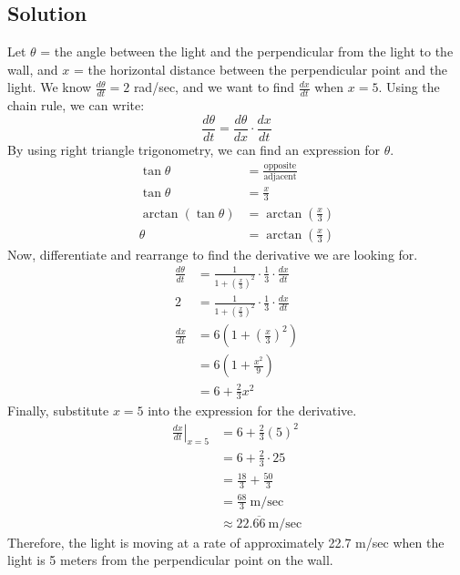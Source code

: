 \documentclass[12pt]{article}
\newcommand\at[2]{\left.#1\right|_{#2}}
\begin{document}
\subsection*{Solution}

Let $ \theta $ = the angle between the light and the perpendicular from the light to the wall, and $ x $ = the horizontal distance between the perpendicular point and the light.
\medskip
\newline
We know $ \frac{d\theta}{dt} = 2 $ rad/sec, and we want to find $ \frac{dx}{dt} $ when $ x = 5 $. Using the chain rule, we can write:
\[ \frac{d\theta}{dt} = \frac{d\theta}{dx} \cdot \frac{dx}{dt} \]
By using right triangle trigonometry, we can find an expression for $ \theta $.
\begin{align*}
    \tan \theta & = \frac{\text{opposite}}{\text{adjacent}} \\
    \tan \theta & = \frac{x}{3} \\
    \arctan \left( \tan \theta \right) & = \arctan \left( \frac{x}{3} \right) \\
    \theta & = \arctan \left( \frac{x}{3} \right)
\end{align*}
Now, differentiate and rearrange to find the derivative we are looking for.
\begin{align*}
    \frac{d\theta}{dt} & = \frac{1}{1 + \left( \frac{x}{3} \right)^2} \cdot \frac{1}{3} \cdot \frac{dx}{dt} \\
    2 & = \frac{1}{1 + \left( \frac{x}{3} \right)^2} \cdot \frac{1}{3} \cdot \frac{dx}{dt} \\
    \frac{dx}{dt} & = 6 \left( 1 + \left( \frac{x}{3} \right)^2 \right) \\
    & = 6 \left( 1 + \frac{x^2}{9} \right) \\
    & = 6 + \frac{2}{3} x^2 
\end{align*}
Finally, substitute $ x = 5 $ into the expression for the derivative.
\begin{align*}
    \at{\frac{dx}{dt}}{x = 5} & = 6 + \frac{2}{3} \left( 5 \right)^2 \\
    & = 6 + \frac{2}{3} \cdot 25 \\
    & = \frac{18}{3} + \frac{50}{3} \\
    & = \frac{68}{3} \ \text{m/sec} \\
    & \approx 22.\overline{66} \ \text{m/sec}
\end{align*}
Therefore, the light is moving at a rate of approximately 22.7 m/sec when the light is 5 meters from the perpendicular point on the wall.
\end{document}
